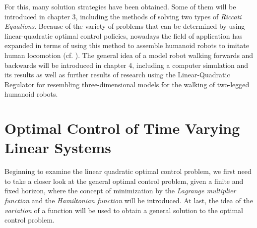 \documentclass[paper=a4, pagesize, DIV=calc, BCOR=12.5mm, twoside=on, onecolumn=on, open = any, titlepage =on, parskip =half-, headsepline = on, footsepline = on, chapterprefix = on, appendixprefix = off, fontsize = 12pt, numbers = noenddot, abstract = on]{scrbook}
\numberwithin{equation}{chapter}
\theoremstyle{definition}
\theoremstyle{plain}
\theoremstyle{plain}
\theoremstyle{remark}
\theoremstyle{plain}
\theoremstyle{plain}
\begin{document}
For this, many solution strategies have been obtained. Some of them will be introduced in chapter 3, including the methods of solving two types of \emph{Riccati Equations}. 
Because of the variety of problems that can be determined by using linear-quadratic optimal control policies, nowadays the field of application has expanded in terms of using this method to assemble humanoid robots to imitate human locomotion (cf. \cite{kajita:2007}). The general idea of a model robot walking forwards and backwards will be introduced in chapter 4, including a computer simulation and its results as well as further results of research using the Linear-Quadratic Regulator for resembling three-dimensional models for the walking of two-legged humanoid robots. 

\newpage
\par\singlespacing
\chapter{Optimal Control of Time Varying Linear Systems}
\onehalfspacing
Beginning to examine the linear quadratic optimal control problem, we first need to take a closer look at the general optimal control problem, given a finite and fixed horizon, where the concept of minimization by the \emph{Lagrange multiplier function} and the \emph{Hamiltonian function} will be introduced. At last, the idea of the \emph{variation} of a function will be used to obtain a general solution to the optimal control problem.
\end{document}
